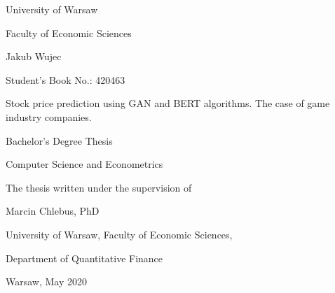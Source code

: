 \documentclass[11pt]{article} %
\renewcommand\maketitle{}
\begin{document}
\maketitle

\begin{center}


\begin{huge}
University of Warsaw

Faculty of Economic Sciences
\end{huge}


\vspace{\baselineskip}\vspace{\baselineskip}\vspace{\baselineskip}

Jakub Wujec

Student's Book No.: 420463

\vspace{\baselineskip}\vspace{\baselineskip}\vspace{\baselineskip}

\begin{huge}
Stock price prediction using GAN and BERT algorithms. The case of game industry companies.
\end{huge}

\vspace{\baselineskip}\vspace{\baselineskip}\vspace{\baselineskip}

Bachelor's Degree Thesis

Computer Science and Econometrics

\vspace{\baselineskip}\vspace{\baselineskip}\vspace{\baselineskip}

\end{center}

\begin{flushright}
The thesis written under the supervision of

Marcin Chlebus, PhD  

University of Warsaw, Faculty of Economic Sciences,

Department of Quantitative Finance
\end{flushright}

\mbox{}
\vfill

\begin{center}
Warsaw, May 2020
\end{center}
\end{document}
